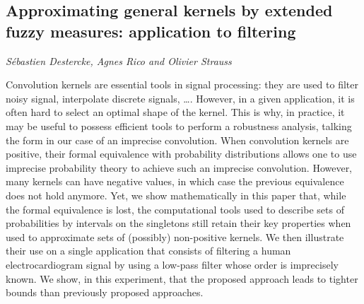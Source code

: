 \documentclass[../booklet.tex]{subfiles}
\begin{document}
\subsection[Approximating general kernels by extended fuzzy measures: application to filtering. {\it Sébastien Destercke, Agnes Rico and Olivier Strauss}]{Approximating general kernels by extended fuzzy measures: application to filtering}
  

\begin{center}
  {\it Sébastien Destercke, Agnes Rico and Olivier Strauss}
\end{center}



Convolution kernels are essential tools in signal processing: they are used to filter noisy signal, interpolate discrete signals, \ldots. However, in a given application, it is often hard to select an optimal shape of the kernel. This is why, in practice, it may be useful to possess efficient tools to perform a robustness analysis, talking the form in our case of an imprecise convolution. When convolution kernels are positive, their formal equivalence with probability distributions allows one to use imprecise probability theory to achieve such an imprecise convolution. However, many kernels can have negative values, in which case the previous equivalence does not hold anymore. Yet, we show mathematically in this paper that, while the formal equivalence is lost, the computational tools used to describe sets of probabilities by intervals on the singletons still retain their key properties when used to approximate sets of (possibly) non-positive kernels. We then illustrate their use on a single application that consists of filtering a human electrocardiogram signal by using a low-pass filter whose order is imprecisely known. We show, in this experiment, that the proposed approach leads to tighter bounds than previously proposed approaches.
\end{document}
